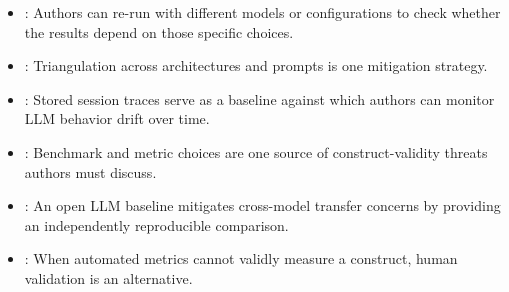 \begin{itemize}[label=$\rightarrow$]
    \item \seemodelversion: Authors can re-run with different models or configurations to check whether the results depend on those specific choices.
    \item \seedesign: Triangulation across architectures and prompts is one mitigation strategy.
    \item \seetraces: Stored session traces serve as a baseline against which authors can monitor LLM behavior drift over time.
    \item \seebenchmarksmetrics: Benchmark and metric choices are one source of construct-validity threats authors must discuss.
    \item \seeopenllm: An open LLM baseline mitigates cross-model transfer concerns by providing an independently reproducible comparison.
    \item \seehumanvalidation: When automated metrics cannot validly measure a construct, human validation is an alternative.
\end{itemize}